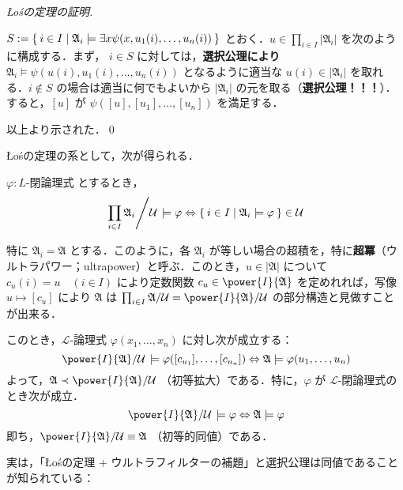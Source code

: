 \documentclass[a4j]{jsarticle}
\newcommand{\Los}{{\L}o\'{s}}
\begin{document}
\begin{proof}[\Los の定理の証明]
\begin{enumerate}[label=(\roman{*})]
	$S \mathrel{:=} \Set{i \in I | \mathfrak{A}_i \models \exists x \psi(x, u_1(i), \dots, u_n(i))}$
	とおく．$u \in \prod_{i \in I} |\mathfrak{A}_i|$ を次のように構成する．まず， $i \in S$ に対しては，{\bfseries 選択公理により} $\mathfrak{A}_i \models \psi(u(i), u_1(i), \dots, u_n(i))$ となるように適当な $u(i) \in |\mathfrak{A}_i|$ を取れる．$i\notin S$ の場合は適当に何でもよいから $|\mathfrak{A}_i|$ の元を取る（{\bfseries 選択公理！！！}）．すると，$[u]$ が $\psi([u], [u_1], \dots, [u_n])$ を満足する．
 \end{enumerate}
 以上より示された．\qed
\end{proof}

\Los の定理の系として，次が得られる．
\begin{corollary}
 $\varphi: L\text{-閉論理式}$ とするとき，
 \[
   \left.{\prod_{i \in I}\mathfrak{A}_i}\middle/{\mathcal{U}}\right. \models \varphi \Leftrightarrow \Set{i \in I | \mathfrak{A}_i \models \varphi} \in \mathcal{U}
 \]
\end{corollary}
\begin{corollary}\label{los-power}
 特に $\mathfrak{A}_i = \mathfrak{A}$ とする．このように，各 $\mathfrak{A}_i$ が等しい場合の超積を，特に{\bfseries 超冪}（ウルトラパワー；ultrapower）と呼ぶ．このとき，$u \in |\mathfrak{A}|$ について $c_u(i) = u \quad (i \in I)$ により定数関数 $c_u \in \power{I}{\mathfrak{A}}$ を定めれれば，写像 $u \mapsto [c_u]$ により $\mathfrak{A}$ は $\prod_{i \in I} \mathfrak{A} / \mathcal{U} = \power{I}{\mathfrak{A}}/\mathcal{U}$ の部分構造と見做すことが出来る．

 このとき，$\mathcal{L}$-論理式 $\varphi(x_1, \dots, x_n)$ に対し次が成立する：
 \[
   \quot{\power{I}{\mathfrak{A}}}{\mathcal{U}} \models \varphi([c_{u_1}], \dots, [c_{u_n}]) \Leftrightarrow  \mathfrak{A} \models \varphi(u_1, \dots, u_n)
 \]
 よって，$\mathfrak{A} \prec \power{I}{\mathfrak{A}}/\mathcal{U}$ （初等拡大）である．特に，$\varphi$ が $\mathcal{L}$-閉論理式のとき次が成立．
 \[
   \quot{\power{I}{\mathfrak{A}}}{\mathcal{U}} \models \varphi \Leftrightarrow  \mathfrak{A} \models \varphi
 \]
 即ち，$\power{I}{\mathfrak{A}}/\mathcal{U} \equiv \mathfrak{A}$ （初等的同値）である．
\end{corollary}

実は，「\Los の定理 + ウルトラフィルターの補題」と選択公理は同値であることが知られている：
\end{document}
